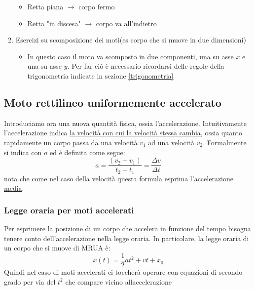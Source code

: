\begin{enumerate}
\begin{itemize}
		      \item Retta piana $ \rightarrow  $ corpo fermo
		      \item Retta "in discesa" $ \rightarrow $ corpo va all'indietro
	      \end{itemize}
	\item Esercizi su scomposizione dei moti(es corpo che si muove in due dimensioni)
	      \begin{itemize}
		      \item In questo caso il moto va scomposto in due componenti, una su asse $ x $ e una su asse $ y $. Per far ciò è necessario ricordarsi delle regole della trigonometria indicate in sezione \ref{trigonometria}
	      \end{itemize}
\end{enumerate}
\subsection{Moto rettilineo uniformemente accelerato}
Introduciamo ora una nuova quantità fisica, ossia l'accelerazione. Intuitivamente l'accelerazione indica \underline{la velocità con cui la velocità stessa cambia}, ossia quanto rapidamente un corpo passa da una velocità $ v_1 $ ad una velocità $ v_2 $. Formalmente si indica con $ a $ ed è definita come segue:
\[
	a = \frac{\left(v_2 - v_1\right)}{t_2 - t_1} = \frac{\Delta v}{\Delta  t}
\]
nota che come nel caso della velocità questa formula esprima l'accelerazione \underline{media}.
\vskip3mm
\subsubsection{Legge oraria per moti accelerati}
Per esprimere la posizione di un corpo che accelera in funzione del tempo bisogna tenere conto dell'accelerazione nella legge oraria. In particolare, la legge oraria di un corpo che si muove di MRUA è:
\[
	x\left(t\right) = \frac{1}{2}at^2 + vt + x_0
\]
Quindi nel caso di moti accelerati ci toccherà operare con equazioni di secondo grado per via del $ t^2  $ che compare vicino allaccelerazione
